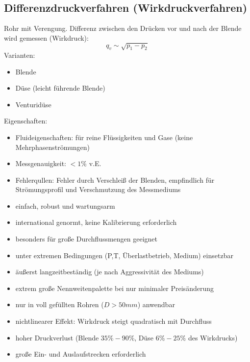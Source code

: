 \subsection{Differenzdruckverfahren (Wirkdruckverfahren)}
Rohr mit Verengung. Differenz zwischen den Drücken vor und nach der Blende wird gemessen (Wirkdruck):
$$q_v\sim \sqrt{p_1-p_2}$$
Varianten:
\begin{itemize}
\item Blende
\item Düse (leicht führende Blende)
\item Venturidüse
\end{itemize}
Eigenschaften:
\begin{itemize}
\item Fluideigenschaften: für reine Flüssigkeiten und Gase (keine Mehrphasenströmungen)
\item Messgenauigkeit: $<1\%$ v.E.
\item Fehlerqullen: Fehler durch Verschleiß der Blenden, empfindlich für Strömungsprofil und Verschmutzung des Messmediums
\end{itemize}
\begin{itemize}[label=$+$]
\item einfach, robust und wartungsarm
\item international genormt, keine Kalibrierung erforderlich
\item besonders für große Durchflussmengen geeignet
\item unter extremen Bedingungen (P,T, Überlastbetrieb, Medium) einsetzbar
\item äußerst langzeitbeständig (je nach Aggressivität des Mediums)
\item extrem große Nennweitenpalette bei nur minimaler Preisänderung
\end{itemize}
\begin{itemize}[label=$-$]
\item nur in voll gefüllten Rohren ($D > 50\unit{mm}$) anwendbar
\item nichtlinearer Effekt: Wirkdruck steigt quadratisch mit Durchfluss
\item hoher Druckverlust (Blende $35\%-90\%$, Düse $6\%-25\%$ des Wirkdrucks)
\item große Ein- und Auslaufstrecken erforderlich
\end{itemize}





